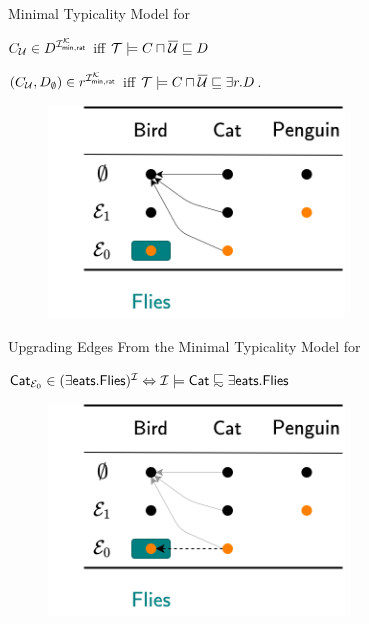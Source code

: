 \documentclass[10pt]{beamer}
\begin{document}
\begin{frame}[fragile]{Minimal Typicality Model for \ELbot}

\begin{center}
  { \large 
    ${C}_{\mathcal{U}} \in D^{\mathcal{I}^{\mathcal{K}}_{\mathsf{{min}, {rat}}}}$ iff $\mathcal{T} \models C \sqcap \overline{\mathcal{U}} \sqsubseteq D$

    \vspace{0.3cm}
    $({C}_{\mathcal{U}},{D}_{\emptyset}) \in r^{\mathcal{I}^{\mathcal{K}}_{\mathsf{{min}, {rat}}}}$ iff $\mathcal{T} \models C \sqcap \overline{\mathcal{U}} \sqsubseteq \exists r.D$.
  }
\end{center}
\pause
\vspace{0.3cm}
\begin{figure}
  \centering
      \includegraphics[width=0.7\textwidth]{img/ratmod002.png}
  \end{figure}


\end{frame}

%
%

\begin{frame}{Upgrading Edges From the Minimal Typicality Model for \ELbot}
  \begin{center}
    { \large 
      $\typel{\dlFont{Cat}}{\Emc_0} \in (\exists \dlFont{eats}.\dlFont{Flies})^{\Imc} \Leftrightarrow \Imc \models \dlFont{Cat} \definc \exists \dlFont{eats}.\dlFont{Flies}$
    }
  \end{center}

  \vspace{0.3cm}
\begin{figure}
  \centering
      \includegraphics[width=0.7\textwidth]{img/ratmod003.png}
  \end{figure}
\end{frame}
\end{document}
